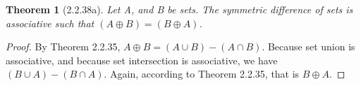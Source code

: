 \documentclass[a4paper, 12pt]{article}
\theoremstyle{plain}
\newtheorem*{theorem*}{Theorem}
\begin{document}
	
	\begin{theorem*}[2.2.38a]
		Let A, and B be sets. The symmetric difference of sets is associative such that 
		$(A \oplus B) = (B \oplus A)$.
	\end{theorem*}
	
	\begin{proof}
		By Theorem 2.2.35, $A \oplus B = (A \cup B) - (A \cap B)$. Because set union is 
		associative, and because set intersection is associative, we have 
		\newline $(B \cup A) - (B \cap A)$. Again, according to Theorem 2.2.35, that is 
		$B \oplus A$.
	\end{proof}
\end{document}
